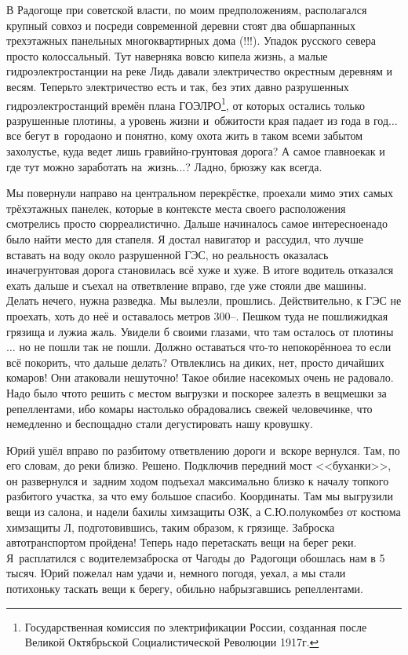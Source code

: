 В Радогоще при советской власти, по моим предположениям, располагался крупный совхоз и посреди современной деревни стоят два обшарпанных трехэтажных панельных многоквартирных дома (!!!). Упадок русского севера просто колоссальный. Тут наверняка вовсю кипела жизнь, а малые гидроэлектростанции на реке Лидь давали электричество окрестным деревням и весям. Теперь\sdash то электричество есть и так, без этих давно разрушенных гидроэлектростанций времён плана ГОЭЛРО\footnote{Государственная комиссия по электрификации России, созданная после Великой Октябрьской Социалистической Революции 1917г.}, от которых остались только разрушенные плотины, а уровень жизни и~обжитости края падает из года в год$\ldots$ все бегут в~города\mdash оно и понятно, кому охота жить в таком всеми забытом захолустье, куда ведет лишь гравийно-грунтовая дорога? А самое главное\mdash как и где тут можно заработать на~жизнь$\ldots$? Ладно, брюзжу как всегда. 

Мы повернули направо на центральном перекрёстке, проехали мимо этих самых трёхэтажных панелек, которые в контексте места своего расположения смотрелись просто сюрреалистично. Дальше начиналось самое интересное\mdash надо было найти место для стапеля. Я достал навигатор и~рассудил, что лучше вставать на воду около разрушенной ГЭС, но реальность оказалась иначе\mdash грунтовая дорога становилась всё хуже и хуже. В итоге водитель отказался ехать дальше и съехал на ответвление вправо, где уже стояли две машины. Делать нечего, нужна разведка. Мы вылезли, прошлись. Действительно, к ГЭС не проехать, хоть до неё и оставалось метров 300\thinspace\nobreakdash--. Пешком туда не пошли\mdash жидкая грязища и лужи\mdash а жаль. Увидели б своими глазами, что там осталось от плотины$\ldots$ но не пошли так не пошли. Должно оставаться что-то непокорённое\mdash а то если всё покорить, что дальше делать? Отвлеклись на диких, нет, просто дичайших комаров! Они атаковали нешуточно! Такое обилие насекомых очень не радовало. Надо было что\sdash то решить с местом выгрузки и поскорее залезть в вещмешки за репеллентами, ибо комары настолько обрадовались свежей человечинке, что немедленно и беспощадно стали дегустировать нашу кровушку.

Юрий ушёл вправо по разбитому ответвлению дороги и~вскоре вернулся. Там, по его словам, до реки близко. Решено. Подключив передний мост <<буханки>>, он развернулся и~задним ходом подъехал максимально близко к началу топкого разбитого участка, за что ему большое спасибо. Координаты\mdash \CoordsLidSeventeenStapel. Там мы выгрузили вещи из салона, и надели бахилы химзащиты ОЗК, а С.Ю.\mdash полукомбез от костюма химзащиты Л, подготовившись, таким образом, к грязище. Заброска автотранспортом пройдена! Теперь надо перетаскать вещи на берег реки. Я~расплатился с водителем\mdash заброска от Чагоды до~Радогощи обошлась нам в 5 тысяч. Юрий пожелал нам удачи и, немного погодя, уехал, а мы стали потихоньку таскать вещи к берегу, обильно набрызгавшись репеллентами.

